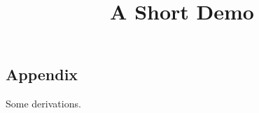 \documentclass[article]{jss}
\title{A Short Demo}
\begin{document}
\begin{appendix}
\subsection{Appendix}
Some derivations.
\end{appendix}
\end{document}
